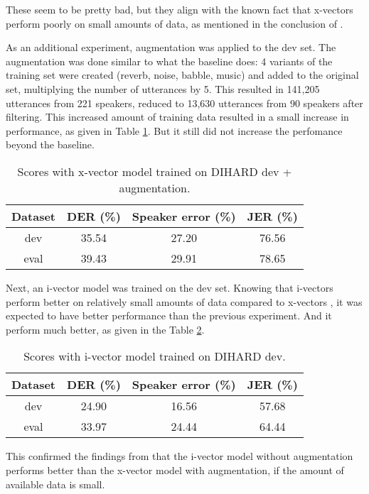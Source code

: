 		These seem to be pretty bad, but they align with the known fact that x-vectors perform poorly on small amounts of data, as mentioned in the conclusion of \cite{huang2018jhu}.
		
		As an additional experiment, augmentation was applied to the dev set. The augmentation was done similar to what the baseline does: 4 variants of the training set were created (reverb, noise, babble, music) and added to the original set, multiplying the number of utterances by 5. This resulted in 141,205 utterances from 221 speakers, reduced to 13,630 utterances from 90 speakers after filtering. This increased amount of training data resulted in a small increase in performance, as given in Table \ref{table-dev-xvec-aug}. But it still did not increase the perfomance beyond the baseline.
		
		\begin{table}[h]
			\centering
			\begin{tabular}{|c|c|c|c|}
				\hline
				Dataset & DER (\%) & Speaker error (\%) & JER (\%) \\
				\hline
				dev & 35.54 & 27.20 & 76.56 \\
				\hline
				eval & 39.43 & 29.91 & 78.65 \\
				\hline
			\end{tabular}
			\caption{Scores with x-vector model trained on DIHARD dev + augmentation.}
			\label{table-dev-xvec-aug}
		\end{table}
	
		Next, an i-vector model was trained on the dev set. Knowing that i-vectors perform better on relatively small amounts of data compared to x-vectors \cite{huang2018jhu}, it was expected to have better performance than the previous experiment. And it perform much better, as given in the Table \ref{table-dev-ivec}.
		
		\begin{table}[h]
			\centering
			\begin{tabular}{|c|c|c|c|}
				\hline
				Dataset & DER (\%) & Speaker error (\%) & JER (\%) \\
				\hline
				dev & 24.90 & 16.56 & 57.68 \\
				\hline
				eval & 33.97 & 24.44 & 64.44 \\
				\hline
			\end{tabular}
			\caption{Scores with i-vector model trained on DIHARD dev.}
			\label{table-dev-ivec}
		\end{table}
		
		This confirmed the findings from \cite{huang2018jhu} that the i-vector model without augmentation performs better than the x-vector model with augmentation, if the amount of available data is small.
		
